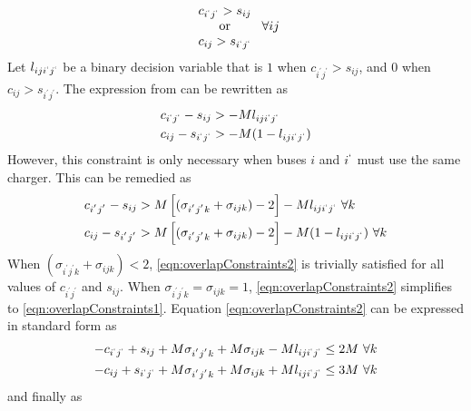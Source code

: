 \begin{equation}\label{eqn:overlapConstraints1}
	\begin{array}{c}
		c_{i^{`}j^{`}} > s_{ij} \\
		\text{or} \\
		c_{ij} > s_{i^{`}j^{`}} 
	\end{array} \ \forall ij
\end{equation}
	Let $l_{iji^{`}j^{`}}$ be a binary decision variable that is $1$ when $c_{i^{'}j^{'}} > s_{ij}$, and $0$ when $c_{ij} > s_{i^{'}j^{'}}$. The expression from  can be rewritten as
\begin{equation} \begin{aligned}
	c_{i^{`}j^{`}} - s_{ij}  &> -Ml_{iji^{`}j^{`}}\\
	c_{ij}-s_{i^{`}j^{`}} &>  -M(1 - l_{iji^{`}j^{`}})
\end{aligned}\end{equation}
	However, this constraint is only necessary when buses $i$ and $i^{`}$ must use the same charger. This can be remedied as
\begin{equation}\label{eqn:overlapConstraints2}\begin{aligned}
	c_{i^{'}j^{'}} - s_{ij} &> M\left[(\sigma_{i^{'}j^{'}k} + \sigma_{ijk}) - 2\right] - Ml_{iji^{`}j^{`}} \ \forall k \\
	c_{ij} - s_{i^{'}j^{'}} &> M\left[(\sigma_{i^{'}j^{'}k} + \sigma_{ijk}) - 2\right] - M(1 - l_{iji^{`}j^{`}})\ \forall k \\
\end{aligned}\end{equation}
When $(\sigma_{i^{'}j^{'}k} + \sigma_{ijk}) < 2$, \eqref{eqn:overlapConstraints2} is trivially satisfied for all values of $c_{i^{'}j^{'}}$ and $s_{ij}$. When $\sigma_{i^{'}j^{'}k} = \sigma_{ijk} = 1$, \eqref{eqn:overlapConstraints2} simplifies to \eqref{eqn:overlapConstraints1}. Equation \eqref{eqn:overlapConstraints2} can be expressed in standard form as 
	\begin{equation}\label{eqn:overlapConstraints3}\begin{aligned}
		-c_{i^{`}j^{`}} + s_{ij} + M\sigma_{i^{'}j^{'}k} + M\sigma_{ijk} - Ml_{iji^{`}j^{`}}&\le 2M  \ \forall k\\
		-c_{ij} + s_{i^{`}j^{`}} + M\sigma_{i^{'}j^{'}k} + M\sigma_{ijk} + Ml_{iji^{`}j^{`}}&\le 3M  \ \forall k\\
	\end{aligned}\end{equation}
	and finally as
